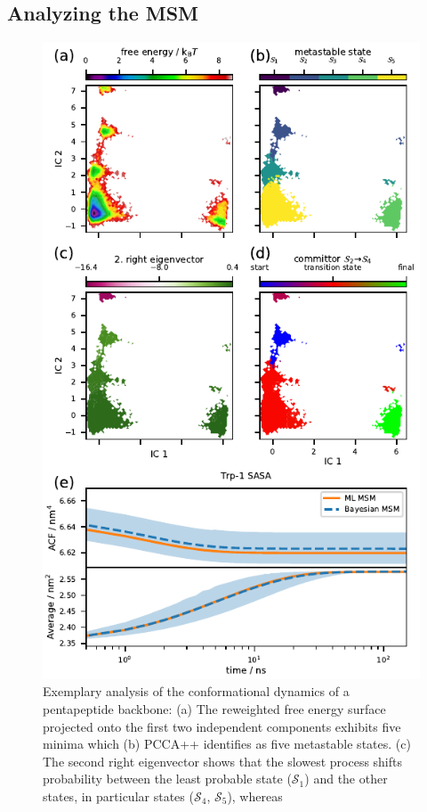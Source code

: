 \documentclass[9pt,tutorial]{livecoms}
\begin{document}
\subsection{Analyzing the MSM}

\begin{figure}
\includegraphics{figure_3}
\caption{Exemplary analysis of the conformational dynamics of a pentapeptide backbone:
(a) The reweighted free energy surface projected onto the first two independent components exhibits five minima which
(b) PCCA++ identifies as five metastable states.
(c) The second right eigenvector shows that the slowest process shifts probability between the least probable state ($\mathcal{S}_1$) and the other states, in particular states ($\mathcal{S}_4$, $\mathcal{S}_5$), whereas
}
\end{figure}
\end{document}

